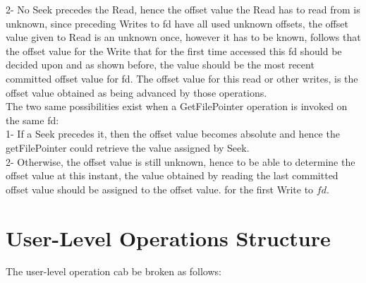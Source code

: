 \documentclass[a4paper, 11pt]{article}
\begin{document}
2- No Seek precedes the Read, hence the offset value the Read has to read from is unknown, since preceding Writes to fd have all used unknown offsets, the offset value given to Read is an unknown once, however it has to be known, follows that the offset value for the Write that for the first time accessed this fd should be decided upon and as shown before, the value should be the most recent committed offset value for fd. The offset value for this read or other writes, is the offset value obtained as being advanced by those operations.\\  

The two same possibilities exist when a GetFilePointer operation is invoked on the same fd:\\

1- If a Seek precedes it, then the offset value becomes absolute and hence the getFilePointer could retrieve the value assigned by Seek.\\

2- Otherwise, the offset value is still unknown, hence to be able to determine the offset value at this instant, the value obtained by reading the last committed offset value should be assigned to the offset value. for the first Write to $fd$.\\






\section{User-Level Operations Structure}

The user-level operation cab be broken as follows:\\
\end{document}
